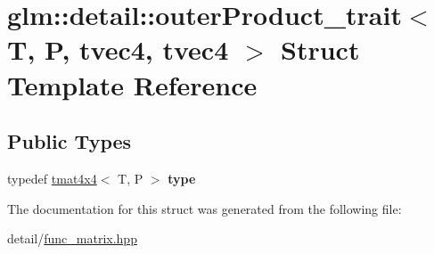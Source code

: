 \hypertarget{structglm_1_1detail_1_1outerProduct__trait_3_01T_00_01P_00_01tvec4_00_01tvec4_01_4}{\section{glm\-:\-:detail\-:\-:outer\-Product\-\_\-trait$<$ T, P, tvec4, tvec4 $>$ Struct Template Reference}
\label{structglm_1_1detail_1_1outerProduct__trait_3_01T_00_01P_00_01tvec4_00_01tvec4_01_4}
}
\subsection*{Public Types}
\begin{DoxyCompactItemize}
\item 
\hypertarget{structglm_1_1detail_1_1outerProduct__trait_3_01T_00_01P_00_01tvec4_00_01tvec4_01_4_a89f0d2b33be6604293d1373176291811}{typedef \hyperlink{structglm_1_1tmat4x4}{tmat4x4}$<$ T, P $>$ {\bfseries type}}\label{structglm_1_1detail_1_1outerProduct__trait_3_01T_00_01P_00_01tvec4_00_01tvec4_01_4_a89f0d2b33be6604293d1373176291811}

\end{DoxyCompactItemize}


The documentation for this struct was generated from the following file\-:\begin{DoxyCompactItemize}
\item 
detail/\hyperlink{func__matrix_8hpp}{func\-\_\-matrix.\-hpp}\end{DoxyCompactItemize}
